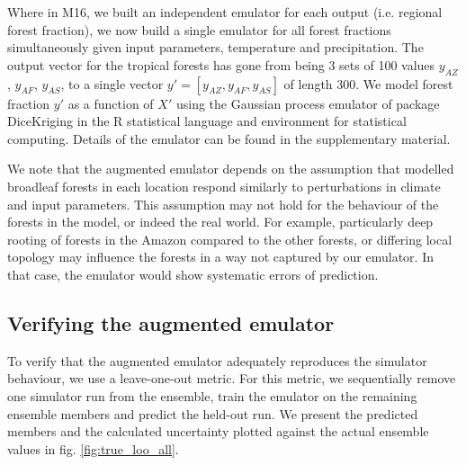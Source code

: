 \documentclass[gmd, manuscript]{copernicus}
\begin{document}
Where in M16, we built an independent emulator for each output (i.e. regional forest fraction), we now build a single emulator for all forest fractions simultaneously given input parameters, temperature and precipitation. The output vector for the tropical forests has gone from being 3 sets of 100 values $y_{AZ}$, $y_{AF}$, $y_{AS}$, to a single vector $y' = [y_{AZ}, y_{AF}, y_{AS}]$ of length 300. We model forest fraction $y'$ as a function of $X'$ using the Gaussian process emulator of package DiceKriging \citep{roustant2012dicekriging} in the R statistical language and environment for statistical computing. Details of the emulator can be found in the supplementary material.

We note that the augmented emulator depends on the assumption that modelled broadleaf forests in each location respond similarly to perturbations in climate and input parameters. This assumption may not hold for the behaviour of the forests in the model, or indeed the real world. For example, particularly deep rooting of forests in the Amazon compared to the other forests, or differing local topology may influence the forests in a way not captured by our emulator. In that case, the emulator would show systematic errors of prediction. 

\subsection{Verifying the augmented emulator}\label{ssec:verifying}
To verify that the augmented emulator adequately reproduces the simulator behaviour, we use a leave-one-out metric. For this metric, we sequentially remove one simulator run from the ensemble, train the emulator on the remaining ensemble members and predict the held-out run. We present the predicted members and the calculated uncertainty plotted against the actual ensemble values in fig. \ref{fig:true_loo_all}.
\end{document}
